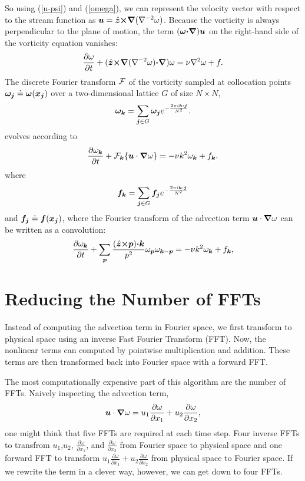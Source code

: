 \documentclass[12pt]{article}
\def\v{\bm}
\def\lap{{\nabla}^2}
\def\lapinv{{\nabla}^{-2}}
\def\vw{{\v\w}}
\def\Eq#1{(\ref{#1})}
\begin{document}
So using \Eq{u-psi} and \Eq{omega}, we can represent the velocity
vector with respect to the stream function as
$\vu=\hat{\vz}\cross\grad(\lapinv\omega)$.
Because the vorticity is always perpendicular to the plane of motion,
the term $(\vw\dot\grad)\vu$ on the right-hand side of the vorticity equation vanishes:
\begin{equation}\label{2D-vorticity-expand}
\frac{\partial \omega}{\partial t} + (\hat{\vz}\cross\grad(\lapinv\omega)\dot\grad)\omega= \nu\lap\omega + f.
\end{equation}
The discrete Fourier transform ${\cal F}$ of the vorticity sampled at collocation
points $\vw_\vj\doteq\vw(\vx_\vj)$ over a two-dimensional lattice
$G$ of size $N\times N$,
$$
\vw_{\vk}=\sum_{\vj\in G} \vw_\vj e^{-\fr{2\pi i\vk\dot\vj}{N^2}}.
$$
evolves according to
\begin{equation}\label{Fourier}
\frac{\partial\omega_{\vk}}{\partial t} + {\cal F}_\vk\{\vu\cdot\grad\omega\}= -\nu k^2\omega_{\vk} + f_{\vk}.
\end{equation}
where 
$$
\vf_{\vk}=\sum_{\vj\in G} \vf_\vj e^{-\fr{2\pi i\vk\dot\vj}{N^2}}
$$
and $\vf_\vj\doteq\vf(\vx_\vj)$,
where the Fourier transform of the advection term
$\vu\cdot\grad\omega$ can be written as a convolution:
\begin{equation}\label{Fourier-expand}
\frac{\partial\omega_{\vk}}{\partial t} + \sum_{\vp}{\frac{(\hat{\vz}\cross\vp)\dot\vk}{p^2}\omega_{\vp}\omega_{\vk-\vp}}= -\nu k^2\omega_{\vk} + f_{\vk},
\end{equation}


\section{Reducing the Number of FFTs}
Instead of computing the advection term in Fourier space, we first transform to physical space using an inverse Fast Fourier Transform (FFT). Now, the nonlinear terms can computed by pointwise multiplication and addition. These terms are then transformed back into Fourier space with a forward FFT.

The most computationally expensive part of this algorithm are the number of FFTs. Naively inspecting the advection term,
\begin{equation}
\vu\cdot\grad\omega = u_1\frac{\partial \omega}{\partial x_1}+u_2\frac{\partial \omega}{\partial x_2},
\end{equation}
one might think that five FFTs are required at each time step. Four inverse FFTs to transfrom $u_1$,$ u_2$, $\frac{\partial \omega}{\partial x_1}$, and $\frac{\partial \omega}{\partial x_2}$ from Fourier space to physical space and one forward FFT to transform $u_1\frac{\partial \omega}{\partial x_1}+u_2\frac{\partial \omega}{\partial x_2}$ from physical space to Fourier space. If we rewrite the term in a clever way, however, we can get down to four FFTs.
\end{document}
